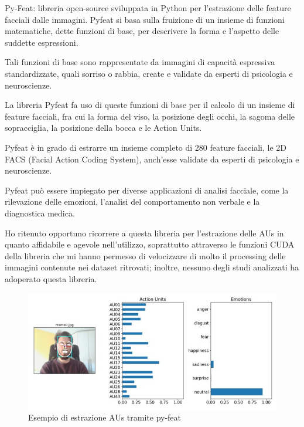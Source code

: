 Py-Feat: libreria open-source sviluppata in Python per l'estrazione delle feature facciali dalle immagini. Pyfeat si basa sulla fruizione di un insieme di funzioni matematiche, dette funzioni di base, per descrivere la forma e l'aspetto delle suddette espressioni. 
    
Tali funzioni di base sono rappresentate da immagini di capacità espressiva standardizzate, quali sorriso o rabbia, create e validate da esperti di psicologia e neuroscienze. 

La libreria Pyfeat fa uso di queste funzioni di base per il calcolo di un insieme di feature facciali, fra cui la forma del viso, la posizione degli occhi, la sagoma delle sopracciglia, la posizione della bocca e le Action Units. 

Pyfeat è in grado di estrarre un insieme completo di 280 feature facciali, le 2D FACS (Facial Action Coding System), anch’esse validate da esperti di psicologia e neuroscienze. 

Pyfeat può essere impiegato per diverse applicazioni di analisi facciale, come la rilevazione delle emozioni, l'analisi del comportamento non verbale e la diagnostica medica. 

Ho ritenuto opportuno ricorrere a questa libreria per l’estrazione delle AUs in quanto affidabile e agevole nell’utilizzo, soprattutto attraverso le funzioni CUDA della libreria che mi hanno permesso di velocizzare di molto il processing delle immagini contenute nei dataset ritrovati; inoltre, nessuno degli studi analizzati ha adoperato questa libreria.
\begin{figure}
    \begin{center}    
        \includegraphics[width=1\linewidth]{images/13.jpg}
        \caption{Esempio di estrazione AUs tramite py-feat}
    \end{center}
\end{figure}